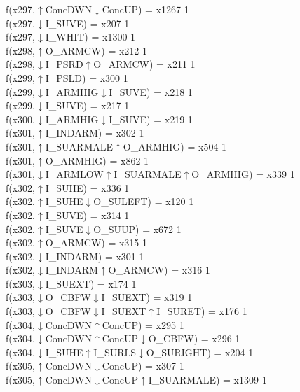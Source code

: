f(x297,$\uparrow$ConcDWN$\downarrow$ConcUP) = x1267 {1} \\
f(x297,$\downarrow$I\_SUVE) = x207 {1} \\
f(x297,$\downarrow$I\_WHIT) = x1300 {1} \\
f(x298,$\uparrow$O\_ARMCW) = x212 {1} \\
f(x298,$\downarrow$I\_PSRD$\uparrow$O\_ARMCW) = x211 {1} \\
f(x299,$\uparrow$I\_PSLD) = x300 {1} \\
f(x299,$\downarrow$I\_ARMHIG$\downarrow$I\_SUVE) = x218 {1} \\
f(x299,$\downarrow$I\_SUVE) = x217 {1} \\
f(x300,$\downarrow$I\_ARMHIG$\downarrow$I\_SUVE) = x219 {1} \\
f(x301,$\uparrow$I\_INDARM) = x302 {1} \\
f(x301,$\uparrow$I\_SUARMALE$\uparrow$O\_ARMHIG) = x504 {1} \\
f(x301,$\uparrow$O\_ARMHIG) = x862 {1} \\
f(x301,$\downarrow$I\_ARMLOW$\uparrow$I\_SUARMALE$\uparrow$O\_ARMHIG) = x339 {1} \\
f(x302,$\uparrow$I\_SUHE) = x336 {1} \\
f(x302,$\uparrow$I\_SUHE$\downarrow$O\_SULEFT) = x120 {1} \\
f(x302,$\uparrow$I\_SUVE) = x314 {1} \\
f(x302,$\uparrow$I\_SUVE$\downarrow$O\_SUUP) = x672 {1} \\
f(x302,$\uparrow$O\_ARMCW) = x315 {1} \\
f(x302,$\downarrow$I\_INDARM) = x301 {1} \\
f(x302,$\downarrow$I\_INDARM$\uparrow$O\_ARMCW) = x316 {1} \\
f(x303,$\downarrow$I\_SUEXT) = x174 {1} \\
f(x303,$\downarrow$O\_CBFW$\downarrow$I\_SUEXT) = x319 {1} \\
f(x303,$\downarrow$O\_CBFW$\downarrow$I\_SUEXT$\uparrow$I\_SURET) = x176 {1} \\
f(x304,$\downarrow$ConcDWN$\uparrow$ConcUP) = x295 {1} \\
f(x304,$\downarrow$ConcDWN$\uparrow$ConcUP$\downarrow$O\_CBFW) = x296 {1} \\
f(x304,$\downarrow$I\_SUHE$\uparrow$I\_SURLS$\downarrow$O\_SURIGHT) = x204 {1} \\
f(x305,$\uparrow$ConcDWN$\downarrow$ConcUP) = x307 {1} \\
f(x305,$\uparrow$ConcDWN$\downarrow$ConcUP$\uparrow$I\_SUARMALE) = x1309 {1} \\
